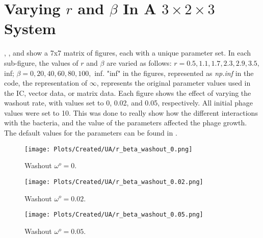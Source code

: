 \section{Varying $r$ and $\beta$ In A $3\times 2\times 3$ System}
, , and  show a 7x7 matrix of figures, each with a unique parameter set. 
In each sub-figure, the values of $r$ and $\beta$ are varied as follows: $r = 0.5, 1.1, 1.7, 2.3, 2.9, 3.5,$ inf; $\beta = 0, 20, 40, 60, 80, 100,$ inf. 
"inf" in the figures, represented as \textit{np.inf} in the code, the representation of $\infty$,  represents the original parameter values used in the IC, vector data, or matrix data. 
Each figure shows the effect of varying the washout rate, with values set to 0, 0.02, and 0.05, respectively.
All initial phage values were set to 10. 
This was done to really show how the different interactions with the bacteria, and the value of the parameters affected the phage growth. 
The default values for the parameters can be found in . 
\begin{figure}[]
    \texttt{[image: Plots/Created/UA/r\_beta\_washout\_0.png]}
    \centering
    \caption{
        Washout $\omega^o=0$. 
    }
    \label{fig:created:r_beta_washout_0}
\end{figure}

\begin{figure}[]
    \texttt{[image: Plots/Created/UA/r\_beta\_washout\_0.02.png]}
    \centering
    \caption{
        Washout $\omega^o=0.02$. 
    }
    \label{fig:created:r_beta_washout_0.02}
\end{figure}

\begin{figure}[]
    \texttt{[image: Plots/Created/UA/r\_beta\_washout\_0.05.png]}
    \centering
    \caption{
        Washout $\omega^o=0.05$. 
    }
    \label{fig:created:r_beta_washout_0.05}
\end{figure}